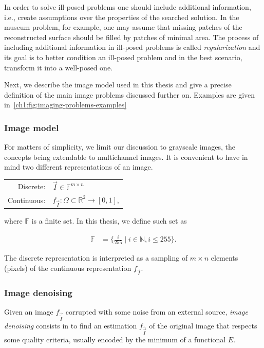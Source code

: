 In order to solve ill-posed problems one should include additional information, i.e., create assumptions over the properties of the searched solution. In the museum problem, for example, one may assume that missing patches of the reconstructed surface should be filled by patches of minimal area. The process of including additional information in ill-posed problems is called \emph{regularization} and its goal is to better condition an ill-posed problem and in the best scenario, transform it into a well-posed one. 

Next, we describe the image model used in this thesis and give a precise definition of the main image problems discussed further on. Examples are given in~\cref{ch1:fig:imaging-problems-examples}

\subsubsection{Image model}
For matters of simplicity, we limit our discussion to grayscale images, the concepts being extendable to multichannel images. It is convenient to have in mind two different representations of an image. \\

\begin{center}
\begin{tabular}{rl}
	Discrete: & $\vec{I} \in \mathbb{F}^{m \times n}$ \\
	Continuous: & $f_{\vec{I}}: \Omega \subset \mathbb{R}^2 \rightarrow [0,1]$,
\end{tabular}
\end{center}

where $\mathbb{F}$ is a finite set. In this thesis, we define such set as

\begin{align}
	\mathbb{F} &= \{ \frac{i}{255} \; | \; i \in \mathbb{N}, i \leq 255 \}.
\end{align}

The discrete representation is interpreted as a sampling of $m \times n$ elements (pixels) of the continuous representation $f_{\vec{I}}$. 

\subsubsection{Image denoising}
Given an image $f_{\vec{\widetilde{I}}}$ corrupted with some noise from an external source, \emph{image denoising} consists in to find an estimation $f_{\widehat{\vec{I}}}$ of the original image that respects some quality criteria, usually encoded by the minimum of a functional $E$. 

